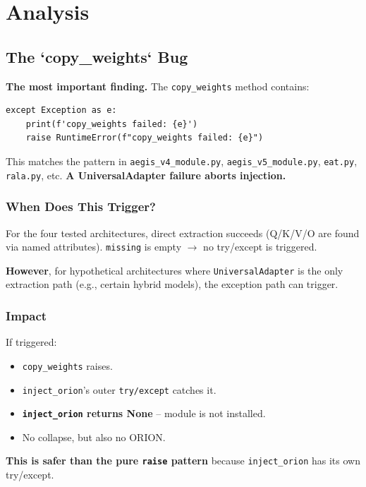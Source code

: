 
\section{Analysis}

\subsection{The `copy\_weights` Bug}

\textbf{The most important finding.} The \texttt{copy\_weights} method contains:

\begin{lstlisting}
except Exception as e:
    print(f'copy_weights failed: {e}')
    raise RuntimeError(f"copy_weights failed: {e}")
\end{lstlisting}

This matches the pattern in \texttt{aegis\_v4\_module.py}, \texttt{aegis\_v5\_module.py}, 
\texttt{eat.py}, \texttt{rala.py}, etc. \textbf{A UniversalAdapter failure aborts injection.}

\subsubsection{When Does This Trigger?}

For the four tested architectures, direct extraction succeeds (Q/K/V/O 
are found via named attributes). \texttt{missing} is empty $\to$ no try/except is 
triggered.

\textbf{However}, for hypothetical architectures where \texttt{UniversalAdapter} is 
the only extraction path (e.g., certain hybrid models), the exception 
path can trigger.

\subsubsection{Impact}

If triggered:
\begin{itemize}
\item \texttt{copy\_weights} raises.
\item \texttt{inject\_orion}'s outer \texttt{try/except} catches it.
\item \textbf{\texttt{inject\_orion} returns None} -- module is not installed.
\item No collapse, but also no ORION.

\end{itemize}
\textbf{This is safer than the pure \texttt{raise} pattern} because \texttt{inject\_orion} 
has its own try/except.

